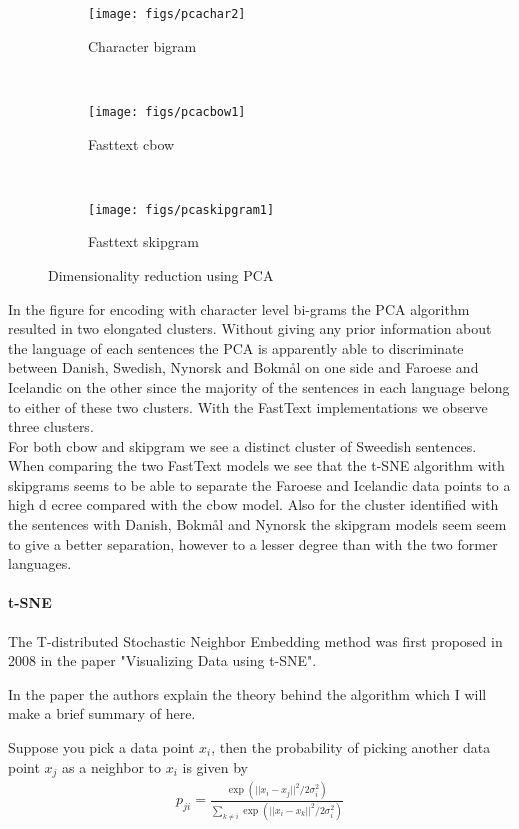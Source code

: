\begin{figure}[h!]
    \centering
    \begin{subfigure}[b]{0.47\textwidth}
        \texttt{[image: figs/pcachar2]}
        \caption{Character bigram}
    \end{subfigure}
    ~
    \begin{subfigure}[b]{0.47\textwidth}
        \texttt{[image: figs/pcacbow1]}
        \caption{Fasttext cbow}
    \end{subfigure}
    ~
    \begin{subfigure}[b]{0.47\textwidth}
        \texttt{[image: figs/pcaskipgram1]}
        \caption{Fasttext skipgram}
    \end{subfigure}
    \caption{Dimensionality reduction using PCA}
    \label{pca}
\end{figure}

In the figure for encoding with character level bi-grams the PCA algorithm resulted in two elongated clusters. Without giving any prior information about the language of each sentences the PCA is apparently able to discriminate between Danish, Swedish, Nynorsk and Bokmål on one side and Faroese and Icelandic on the other since the majority of the sentences in each language belong to either of these two clusters. With the FastText implementations we observe three clusters.\\

For both cbow and skipgram we see a distinct cluster of Sweedish sentences. When comparing the two FastText models we see that the t-SNE algorithm with skipgrams seems to be able to separate the Faroese and Icelandic data points to a high d ecree compared with the cbow model. Also for the cluster identified with the sentences with Danish, Bokmål and Nynorsk the skipgram models seem seem to give a better separation, however to a lesser degree than with the two former languages.

\paragraph{t-SNE}

The T-distributed Stochastic Neighbor Embedding method was first proposed in 2008 in the paper "Visualizing Data using t-SNE"\cite{tsne}.

In the paper the authors explain the theory behind the algorithm which I  will make a brief summary of here.

Suppose you pick a data point $x_i$, then the probability of picking another data point $x_j$ as a neighbor to $x_i$ is given by
\begin{align}
p_{ji}= \frac{\exp (|| x_i - x_j ||^2/2\sigma_i^2 )}{\sum_{k\neq i} \exp (|| x_i - x_k ||^2/2\sigma_i^2 )}
\end{align}


